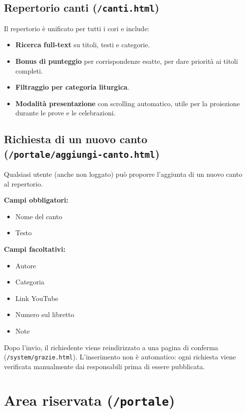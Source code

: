 \documentclass[a4paper,12pt]{article}
\begin{document}
	\subsection{Repertorio canti (\texttt{/canti.html})}
	
	Il repertorio è unificato per tutti i cori e include:
	
	\begin{itemize}
		\item \textbf{Ricerca full-text} su titoli, testi e categorie.
		\item \textbf{Bonus di punteggio} per corrispondenze esatte, per dare priorità ai titoli completi.
		\item \textbf{Filtraggio per categoria liturgica}.
		\item \textbf{Modalità presentazione} con scrolling automatico, utile per la proiezione durante le prove e le celebrazioni.
	\end{itemize}
	
	\subsection{Richiesta di un nuovo canto (\texttt{/portale/aggiungi-canto.html})}
	
	Qualsiasi utente (anche non loggato) può proporre l'aggiunta di un nuovo canto al repertorio.
	
	\textbf{Campi obbligatori:}
	\begin{itemize}
		\item Nome del canto
		\item Testo
	\end{itemize}
	
	\textbf{Campi facoltativi:}
	\begin{itemize}
		\item Autore
		\item Categoria
		\item Link YouTube
		\item Numero sul libretto
		\item Note
	\end{itemize}
	
	Dopo l'invio, il richiedente viene reindirizzato a una pagina di conferma (\texttt{/system/grazie.html}).  
	L'inserimento non è automatico: ogni richiesta viene verificata manualmente dai responsabili prima di essere pubblicata.
	
	\section{Area riservata (\texttt{/portale})}
	
\end{document}
